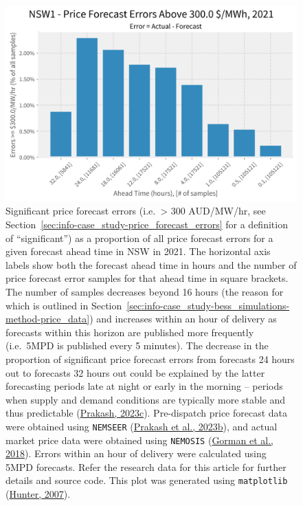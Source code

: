 \documentclass[12pt,a4paper,]{report}
\begin{document}
\begin{figure}
\hypertarget{fig:nsw_significant_price_error_counts}{%
\centering
\includegraphics{source/figures/NSW1_percent_above_300.0_2021.png}
\caption[Count of significant price errors by forecast ahead
time]{Significant price forecast errors (i.e.~\textgreater{} 300
AUD/MW/hr, see Section~\ref{sec:info-case_study-price_forecast_errors}
for a definition of ``significant'') as a proportion of all price
forecast errors for a given forecast ahead time in NSW in 2021. The
horizontal axis labels show both the forecast ahead time in hours and
the number of price forecast error samples for that ahead time in square
brackets. The number of samples decreases beyond 16 hours (the reason
for which is outlined in
Section~\ref{sec:info-case_study-bess_simulations-method-price_data})
and increases within an hour of delivery as forecasts within this
horizon are published more frequently (i.e.~5MPD is published every 5
minutes). The decrease in the proportion of significant price forecast
errors from forecasts 24 hours out to forecasts 32 hours out could be
explained by the latter forecasting periods late at night or early in
the morning -- periods when supply and demand conditions are typically
more stable and thus predictable
(\protect\hyperlink{ref-prakashLookingPredispatchDemand2023}{Prakash,
2023c}). Pre-dispatch price forecast data were obtained using
\texttt{NEMSEER}
(\protect\hyperlink{ref-prakashNEMSEERPythonPackage2023}{Prakash et al.,
2023b}), and actual market price data were obtained using
\texttt{NEMOSIS}
(\protect\hyperlink{ref-gormanNEMOSISNEMOpen2018}{Gorman et al., 2018}).
Errors within an hour of delivery were calculated using 5MPD forecasts.
Refer the research data for this article for further details and source
code. This plot was generated using \texttt{matplotlib}
(\protect\hyperlink{ref-hunterMatplotlib2DGraphics2007}{Hunter,
2007}).}\label{fig:nsw_significant_price_error_counts}
}
\end{figure}
\end{document}

